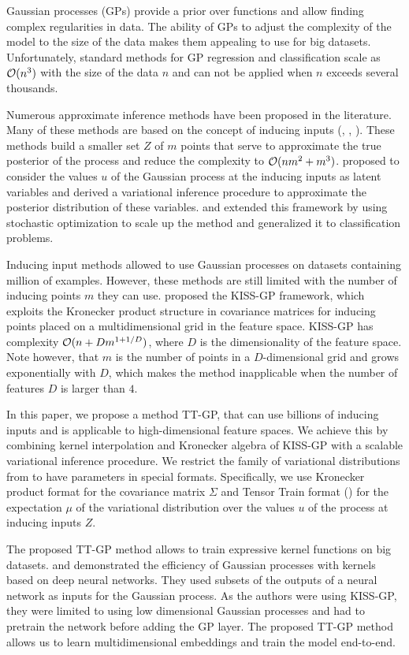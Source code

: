Gaussian processes (GPs) provide a prior over functions and allow finding complex
regularities in data. The ability of GPs to adjust the complexity of the model
to the size of the data makes them appealing to use for big datasets.
Unfortunately, standard methods for GP regression and classification scale as
$\mathcal{O}(n^3)$ with the size of the data $n$ and can not be applied when $n$
exceeds several thousands.

Numerous approximate inference methods have been proposed in the literature. Many
of these methods are based on the concept of inducing inputs (\citet{candela2005},
\citet{snelson2006}, \citet{williams2000}). These methods build a smaller set
$Z$ of $m$ points that serve to approximate the true posterior of the process
and reduce the complexity to $\mathcal{O}(nm^2 + m^3)$. \citet{titsias2009} proposed
to consider the values $u$ of the Gaussian process at the inducing inputs
as latent variables and derived a variational inference procedure to approximate
the posterior distribution of these variables. \citet{hensman2013} and
\citet{hensman2015} extended this framework by using stochastic optimization to
scale up the method and generalized it to classification problems.

Inducing input methods allowed to use Gaussian processes on datasets containing
million of examples. However, these methods are still limited with the number
of inducing points $m$ they can use. \citet{wilson2015} proposed the KISS-GP
framework, which exploits the Kronecker product structure in covariance matrices
for inducing points placed on a multidimensional grid in the feature space.
KISS-GP has complexity $\mathcal{O}(n + D m^{1 + 1/D})$, where $D$ is the dimensionality
of the feature space. Note however, that $m$ is the number of points in a
$D$-dimensional grid and grows exponentially with $D$, which makes the method
inapplicable when the number of features $D$ is larger than $4$.

In this paper, we propose a method TT-GP, that can use billions of inducing
inputs and is applicable to high-dimensional feature spaces.
We achieve this by combining kernel interpolation and Kronecker algebra of KISS-GP with
a scalable variational inference procedure. We restrict the family of
variational distributions from \citet{hensman2013} to have parameters in
special formats. Specifically, we use Kronecker product format for the
covariance matrix $\Sigma$ and Tensor Train format (\citet{oseledets2011}) for the
expectation $\mu$ of the variational distribution over the values $u$ of the
process at inducing inputs $Z$.

The proposed TT-GP method allows to train expressive kernel functions
on big datasets. \citet{wilson2016deep} and \citet{wilson2016stochastic}
demonstrated the efficiency of Gaussian processes with kernels based on deep
neural networks. They used subsets of the outputs of a neural network as
inputs for the Gaussian process. As the authors were using KISS-GP, they
were limited to using low dimensional Gaussian processes and had to
pretrain the network before adding the GP layer. The proposed TT-GP method
allows us to learn multidimensional embeddings and train the model end-to-end.
